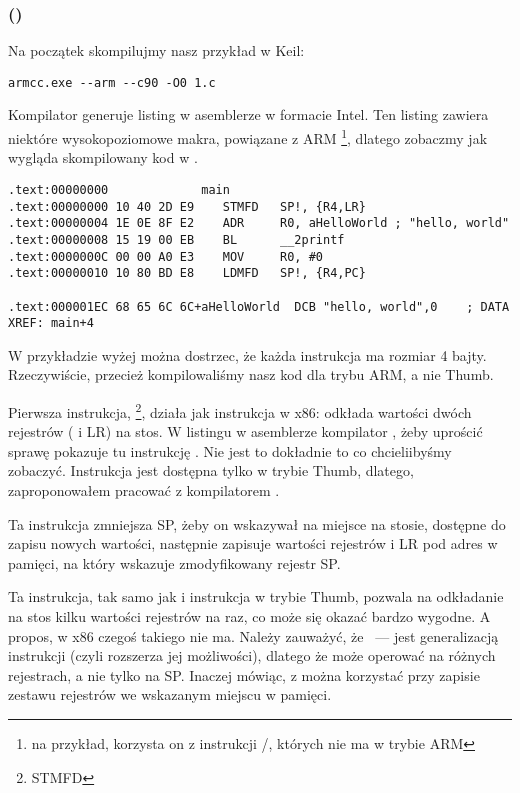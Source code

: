 \subsubsection{\NonOptimizingKeilVI (\ARMMode)}

Na początek skompilujmy nasz przykład w Keil:

\begin{lstlisting}
armcc.exe --arm --c90 -O0 1.c 
\end{lstlisting}

\myindex{\IntelSyntax}
Kompilator  generuje listing w asemblerze w formacie Intel.
Ten listing zawiera niektóre wysokopoziomowe makra, powiązane z ARM
\footnote{na przykład, korzysta on z instrukcji \PUSH/\POP, których nie ma w trybie ARM},
dlatego zobaczmy jak wygląda skompilowany kod w \IDA.

\begin{lstlisting}[caption=\NonOptimizingKeilVI (\ARMMode) \IDA,style=customasmARM]
.text:00000000             main
.text:00000000 10 40 2D E9    STMFD   SP!, {R4,LR}
.text:00000004 1E 0E 8F E2    ADR     R0, aHelloWorld ; "hello, world"
.text:00000008 15 19 00 EB    BL      __2printf
.text:0000000C 00 00 A0 E3    MOV     R0, #0
.text:00000010 10 80 BD E8    LDMFD   SP!, {R4,PC}

.text:000001EC 68 65 6C 6C+aHelloWorld  DCB "hello, world",0    ; DATA XREF: main+4
\end{lstlisting}

W przykładzie wyżej można dostrzec, że każda instrukcja ma rozmiar 4 bajty.
Rzeczywiście, przecież kompilowaliśmy nasz kod dla trybu ARM, a nie Thumb.

Pierwsza instrukcja, \footnote{\ac{STMFD}},
działa jak instrukcja \PUSH w x86: odkłada wartości dwóch rejestrów ( i \ac{LR}) na stos.
W listingu w asemblerze kompilator , żeby uprościć sprawę pokazuje tu instrukcję
.
Nie jest to dokładnie to co chcieliibyśmy zobaczyć. Instrukcja \PUSH jest dostępna tylko w trybie Thumb, dlatego,
 zaproponowałem pracować z kompilatorem \IDA.

Ta instrukcja zmniejsza \ac{SP}, żeby on wskazywał na miejsce na stosie, dostępne do zapisu nowych wartości, następnie zapisuje wartości rejestrów  i \ac{LR} 
pod adres w pamięci, na który wskazuje zmodyfikowany rejestr \ac{SP}.

Ta instrukcja, tak samo jak i instrukcja \PUSH w trybie Thumb, pozwala na odkładanie na stos kilku wartości rejestrów na raz, co może się okazać bardzo wygodne.
A propos, w x86 czegoś takiego nie ma.
Należy zauważyć, że ~--- jest generalizacją instrukcji \PUSH (czyli rozszerza jej możliwości), dlatego że może operować na różnych rejestrach, a nie tylko na \ac{SP}.
Inaczej mówiąc, z  można korzystać przy zapisie zestawu rejestrów we wskazanym miejscu w pamięci.

